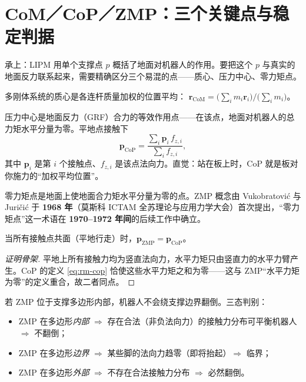 \section{CoM／CoP／ZMP：三个关键点与稳定判据}
\label{sec:rm-zmp}

承上：LIPM 用单个支撑点 $p$ 概括了地面对机器人的作用。要把这个 $p$ 与真实的地面反力联系起来，需要精确区分三个易混的点——质心、压力中心、零力矩点。

\begin{definition}[质心 CoM]
多刚体系统的质心是各连杆质量加权的位置平均：
$\mathbf{r}_{\mathrm{CoM}}=\big(\sum_i m_i\mathbf{r}_i\big)\big/\big(\sum_i m_i\big)$。
\end{definition}

\begin{definition}
压力中心是地面反力（GRF）合力的等效作用点——在该点，地面对机器人的总力矩水平分量为零。平地点接触下
\begin{equation}
  \mathbf{p}_{\mathrm{CoP}}=\frac{\sum_i \mathbf{p}_i\, f_{z,i}}{\sum_i f_{z,i}},
  \label{eq:rm-cop}
\end{equation}
其中 $\mathbf{p}_i$ 是第 $i$ 个接触点、$f_{z,i}$ 是该点法向力。直觉：站在板上时，CoP 就是板对你施力的“加权平均位置”。
\end{definition}

\begin{definition}
零力矩点是地面上使地面合力矩水平分量为零的点。ZMP 概念由 Vukobratović 与 Juričić 于 \textbf{1968 年}（莫斯科 ICTAM 全苏理论与应用力学大会）首次提出，“零力矩点”这一术语在 \textbf{1970–1972 年间}的后续工作中确立\cite{vukobratovic2004zero}。
\end{definition}

\begin{theorem}[平地 ZMP$=$CoP]
\label{thm:rm-zmp-cop}
当所有接触点共面（平地行走）时，$\mathbf{p}_{\mathrm{ZMP}}=\mathbf{p}_{\mathrm{CoP}}$。
\end{theorem}
\begin{proof}[证明骨架]
平地上所有接触力均为竖直法向力，水平力矩只由竖直力的水平力臂产生。CoP 的定义 \cref{eq:rm-cop} 恰使这些水平力矩之和为零——这与 ZMP“水平力矩为零”的定义重合，故二者同点。
\end{proof}

\begin{theorem}
\label{thm:rm-zmp-stable}
若 ZMP 位于支撑多边形内部，机器人不会绕支撑边界翻倒。三态判别：
\begin{itemize}
  \item ZMP 在多边形\emph{内部} $\Rightarrow$ 存在合法（非负法向力）的接触力分布可平衡机器人 $\Rightarrow$ 不翻倒；
  \item ZMP 在多边形\emph{边界} $\Rightarrow$ 某些脚的法向力趋零（即将抬起）$\Rightarrow$ 临界；
  \item ZMP 在多边形\emph{外部} $\Rightarrow$ 不存在合法接触力分布 $\Rightarrow$ 必然翻倒。
\end{itemize}
\end{theorem}

